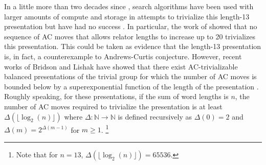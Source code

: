 In a little more than two decades since \cite{genetic, bfs-ac}, search algorithms have been used with larger amounts of compute and storage in attempts to trivialize this length-13 presentation but have had no success \cite{Bowman-McCaul, krawiec2016distance, Panteleev-Ushakov}. 
In particular, the work of \cite{Panteleev-Ushakov} showed that no sequence of AC moves that allows relator lengths to increase up to 20 trivializes this presentation. This could be taken as  evidence that the length-13 presentation is, in fact, a counterexample to Andrews-Curtis conjecture. However, recent works of Bridson and Lishak have showed that there exist AC-trivializable balanced presentations of the trivial group for which the number of AC moves is bounded below by a superexponential function of the length of the presentation \cite{Bridson, Lishak}.
Roughly speaking, for these presentations, if the sum of word lengths is $n$, the number of AC moves required to trivialize the presentation is at least $\Delta (\lfloor \log_2 (n) \rfloor)$ where $\Delta \colon \mathbb{N} \to \mathbb{N}$ is defined recursively as $\Delta(0) = 2$ and $\Delta (m) = 2^{\Delta(m-1)}$ for $m \geq 1$.
\footnote{Note that for $n=13$, $\Delta (\lfloor \log_2 (n) \rfloor) = 65536$.  }
\newline

